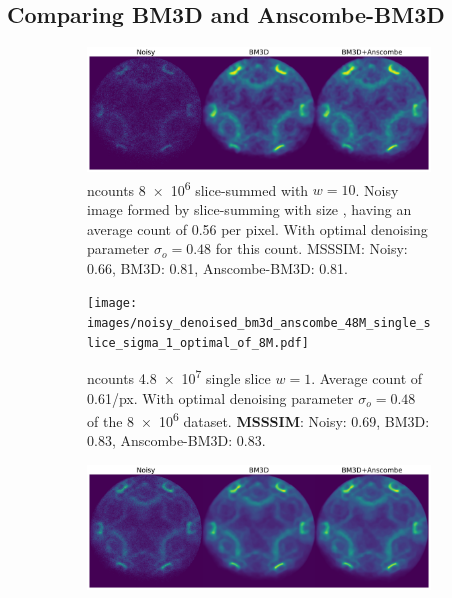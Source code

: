 \subsection{Comparing BM3D and Anscombe-BM3D}
\begin{figure}
    \centering
    \begin{subfigure}[b]{0.95\linewidth}
        \centering
        \includegraphics[width=1\linewidth]{images/noisy_denoised_bm3d_anscombe_8M_10slices_optimal_sigma.pdf}
        \caption{\gls{ncounts} \num{8e6} slice-summed with $w=10$. Noisy image formed by slice-summing with size , having an average count of \num{0.56} per pixel. With optimal denoising parameter $\sigma_o = 0.48$ for this count. \gls{MSSSIM}: Noisy: 0.66, BM3D: 0.81, Anscombe-BM3D: 0.81.}
        \label{fig:noisy-denoised-bm3d-anscombe-8M-10slices-optimal-sigma}
    \end{subfigure}
    \begin{subfigure}[b]{0.95\linewidth}
        \centering
        \texttt{[image: images/noisy\_denoised\_bm3d\_anscombe\_48M\_single\_slice\_sigma\_1\_optimal\_of\_8M.pdf]}
        \caption{\gls{ncounts} \num{4.8e7} single slice $w=1$. Average count of \num{0.61}/px. With optimal denoising parameter $\sigma_o = 0.48$ of the \num{8e6} dataset. \textbf{\gls{MSSSIM}}: Noisy: 0.69, BM3D: 0.83, Anscombe-BM3D: 0.83.}
        \label{fig:noisy-denoised-bm3d-anscombe-48M-single-slice-sigma-1}
    \end{subfigure}
    \begin{subfigure}[b]{0.95\linewidth}
        \centering
        \includegraphics[width=1\linewidth]{images/noisy_denoised_bm3d_anscombe_48M_10slices_optimal_sigma.pdf}

\end{subfigure}
\end{figure}
